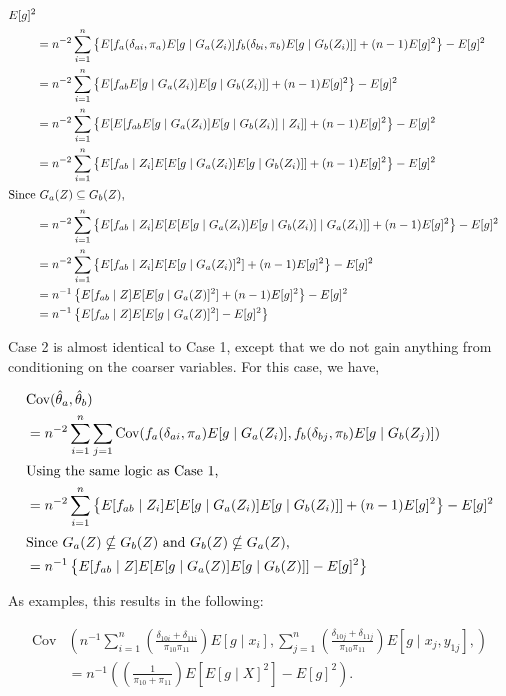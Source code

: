 \documentclass[
  letterpaper,
  DIV=11,
  numbers=noendperiod]{scrartcl}
\newcommand{\Cov}{{\text{Cov}}}
\begin{document}
\begin{align*}
E[g]^2 \\
&= n^{-2} \sum_{i = 1}^n \left\{
E[f_a(\delta_{ai}, \pi_a)E[g \mid G_a(Z_i)] f_b(\delta_{bi}, \pi_b)E[g \mid G_b(Z_i)] ] +
(n - 1) E[g]^2\right\} - E[g]^2 \\
&= n^{-2} \sum_{i = 1}^n \left\{
E[f_{ab}E[g \mid G_a(Z_i)] E[g \mid G_b(Z_i)] ] +
(n - 1) E[g]^2\right\} - E[g]^2 \\
&= n^{-2} \sum_{i = 1}^n \left\{
E[E[f_{ab}E[g \mid G_a(Z_i)] E[g \mid G_b(Z_i)] \mid Z_i]] +
(n - 1) E[g]^2\right\} - E[g]^2 \\
&= n^{-2} \sum_{i = 1}^n \left\{
E[f_{ab} \mid Z_i] E[E[g \mid G_a(Z_i)] E[g \mid G_b(Z_i)]] +
(n - 1) E[g]^2\right\} - E[g]^2 \\
\intertext{Since $G_a(Z) \subseteq G_b(Z)$,}
&= n^{-2} \sum_{i = 1}^n \left\{
E[f_{ab} \mid Z_i] E[E[E[g \mid G_a(Z_i)] E[g \mid G_b(Z_i)] \mid G_a(Z_i)]] +
(n - 1) E[g]^2\right\} - E[g]^2 \\
&= n^{-2} \sum_{i = 1}^n \left\{
E[f_{ab} \mid Z_i] E[E[g \mid G_a(Z_i)]^2] + (n - 1) E[g]^2\right\} - E[g]^2 \\
&= n^{-1} \left\{
E[f_{ab} \mid Z] E[E[g \mid G_a(Z)]^2] + (n - 1) E[g]^2\right\} - E[g]^2 \\
&= n^{-1} \left\{
E[f_{ab} \mid Z] E[E[g \mid G_a(Z)]^2] - E[g]^2\right\}\\
\end{align*}

Case 2 is almost identical to Case 1, except that we do not gain
anything from conditioning on the coarser variables. For this case, we
have,

\begin{align*}
&\Cov(\hat \theta_a, \hat \theta_b) \\ 
&= n^{-2} \sum_{i = 1}^n \sum_{j = 1} \Cov(f_a(\delta_{ai}, \pi_a)E[g \mid G_a(Z_i)],
f_b(\delta_{bj}, \pi_b)E[g \mid G_b(Z_j)])\\
\intertext{Using the same logic as Case 1,}
&= n^{-2} \sum_{i = 1}^n \left\{
E[f_{ab} \mid Z_i] E[E[g \mid G_a(Z_i)] E[g \mid G_b(Z_i)]] +
(n - 1) E[g]^2\right\} - E[g]^2 \\
\intertext{Since $G_a(Z) \nsubseteq G_b(Z)$ and $G_b(Z) \nsubseteq G_a(Z)$,}
&= n^{-1} \left\{
E[f_{ab} \mid Z] E[E[g \mid G_a(Z)]E[g \mid G_b(Z)]] - E[g]^2\right\}\\
\end{align*}

As examples, this results in the following:

\begin{align*}
\Cov&\left(n^{-1} \sum_{i = 1}^n \left(
\frac{\delta_{10i} + \delta_{11i}}{\pi_{10} \pi_{11}}\right) E[g \mid x_i],
\sum_{j = 1}^n \left(
\frac{\delta_{10j} + \delta_{11j}}{\pi_{10} \pi_{11}}\right) E[g \mid x_j, y_{1j}],
\right)\\
&= n^{-1}\left(\left(\frac{1}{\pi_{10} + \pi_{11}}\right) E[E[g \mid X]^2] - E[g]^2\right).
\end{align*}
\end{document}
